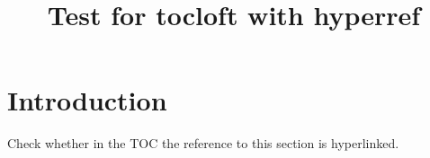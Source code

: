 \documentclass{article}
\begin{document}
\title{Test for tocloft with hyperref} \maketitle

\tableofcontents

\section{Introduction}
Check whether in the TOC the reference to this section is hyperlinked.
\end{document}
